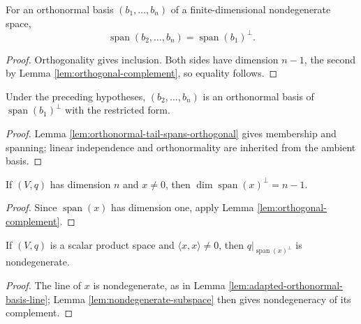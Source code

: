 \begin{lemma}
\label{lem:orthonormal-tail-spans-orthogonal}
\leanok
{}
For an orthonormal basis $(b_1,\ldots,b_n)$ of a finite-dimensional nondegenerate space,
\[
\operatorname{span}(b_2,\ldots,b_n)=\operatorname{span}(b_1)^\perp.
\]
\end{lemma}
\begin{proof}
\leanok
{}
\sketch Orthogonality gives inclusion. Both sides have dimension $n-1$, the second by Lemma \ref{lem:orthogonal-complement}, so equality follows.
\end{proof}

\begin{lemma}
\label{lem:orthonormal-basis-orthogonal-complement}
\leanok
{}
Under the preceding hypotheses, $(b_2,\ldots,b_n)$ is an orthonormal basis of $\operatorname{span}(b_1)^\perp$ with the restricted form.
\end{lemma}
\begin{proof}
\leanok
{}
\sketch Lemma \ref{lem:orthonormal-tail-spans-orthogonal} gives membership and spanning; linear independence and orthonormality are inherited from the ambient basis.
\end{proof}

\begin{lemma}
\label{lem:orthogonal-complement-non-null-line-hyperplane}
\leanok
{}
If $(V,q)$ has dimension $n$ and $x\ne0$, then $\dim\operatorname{span}(x)^\perp=n-1$.
\end{lemma}
\begin{proof}
\leanok
{}
\sketch Since $\operatorname{span}(x)$ has dimension one, apply Lemma \ref{lem:orthogonal-complement}.
\end{proof}

\begin{lemma}
\label{lem:orthogonal-complement-non-null-line-nondegenerate}
\leanok
{}
If $(V,q)$ is a scalar product space and $\langle x,x\rangle\ne0$, then $q|_{\operatorname{span}(x)^\perp}$ is nondegenerate.
\end{lemma}
\begin{proof}
\leanok
{}
\sketch The line of $x$ is nondegenerate, as in Lemma \ref{lem:adapted-orthonormal-basis-line}; Lemma \ref{lem:nondegenerate-subspace} then gives nondegeneracy of its complement.
\end{proof}

